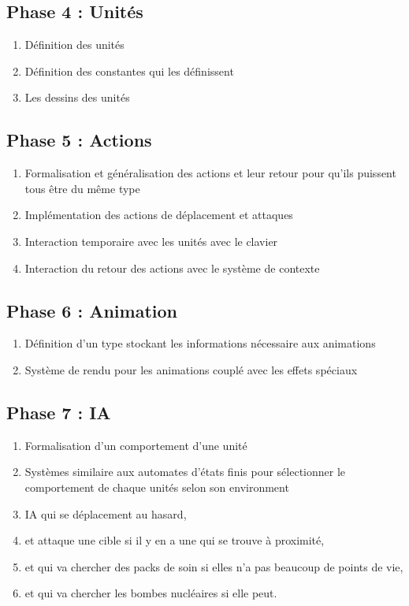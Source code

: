 \documentclass{article}
\begin{document}
\subsection*{Phase 4 : Unités}
\begin{enumerate}
    \item Définition des unités
    \item Définition des constantes qui les définissent
    \item Les dessins des unités
\end{enumerate}

\subsection*{Phase 5 : Actions}
\begin{enumerate}
    \item Formalisation et généralisation des actions et leur retour pour qu'ils puissent tous être du même type
    \item Implémentation des actions de déplacement et attaques
    \item Interaction temporaire avec les unités avec le clavier
    \item Interaction du retour des actions avec le système de contexte
\end{enumerate}


\subsection*{Phase 6 : Animation}
\begin{enumerate}
    \item Définition d'un type stockant les informations nécessaire aux animations
    \item Système de rendu pour les animations couplé avec les effets spéciaux
\end{enumerate}

\subsection*{Phase 7 : IA}
\begin{enumerate}
    \item Formalisation d'un comportement d'une unité 
    \item Systèmes similaire aux automates d'états finis pour sélectionner le comportement de chaque unités selon son environment
    \item IA qui se déplacement au hasard,
    \item et attaque une cible si il y en a une qui se trouve à proximité,
    \item et qui va chercher des packs de soin si elles n'a pas beaucoup de points de vie,
    \item et qui va chercher les bombes nucléaires si elle peut.
\end{enumerate}
\end{document}
